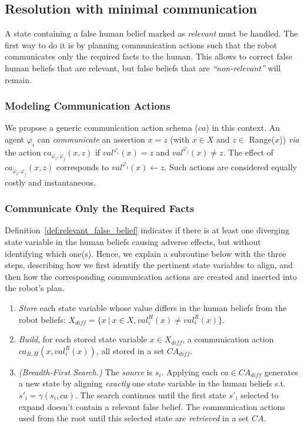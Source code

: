 {    \subsection{Resolution with minimal communication}

A state containing a false human belief marked as \textit{relevant} must be handled. 
The first way to do it is by planning communication actions such that the robot communicates only the required facts to the human. This allows to correct false human beliefs that are relevant, but false beliefs that are \textit{``non-relevant''} will remain. 

\subsubsection{Modeling Communication Actions} 
We propose a generic communication action schema ($ca$) in this context. 
An agent $\varphi_i$ can \textit{communicate} an assertion $x=z$ (with $x \in X$ and $z \in$ Range($x$)) \textit{via} the action $ca_{\varphi_i, \varphi_j}(x,z)$ if $val^{\varphi_i}(x) = z$ and $val^{\varphi_j}(x) \neq z$.
The effect of $ca_{\varphi_i, \varphi_j}(x,z)$ corresponds to $val^{\varphi_j}(x) \leftarrow z$. Such actions are considered equally costly and instantaneous.

\subsubsection{Communicate Only the Required Facts}
Definition~\ref{def:relevant_false_belief} indicates if there is at least one diverging state variable in the human beliefs causing adverse effects, but without identifying which one(s).
Hence, we explain a subroutine below with the three steps, describing how we first identify the pertinent state variables to align, and then how the corresponding communication actions are created and inserted into the robot's plan.

\begin{enumerate}
    \item 
    \textit{Store} each state variable whose value differs in the human beliefs from the robot beliefs: $X_{diff} = \{ x ~|~ x\in X, val^H_i(x) \neq val^R_i(x) \}$.

    \item
    \textit{Build}, for each stored state variable $x \in X_{diff}$, a communication action $ca_{R, H}(x,val^R_i(x))$, all stored in a set $\mathit{CA}_{diff}$.

    \item 
    \textit{(Breadth-First Search.)} 
    The \textit{source} is $s_i$. Applying each $ca \in \mathit{CA}_{diff}$ generates a new state by aligning \textit{exactly} one state variable in the human beliefs s.t. $s'_i = \gamma(s_i, ca )$. 
    The search continues until the first state $s'_i$ selected to expand doesn't contain a relevant false belief. The communication actions used from the root until this selected state are \textit{retrieved} in a set $\mathit{CA}$.
\end{enumerate}

}
